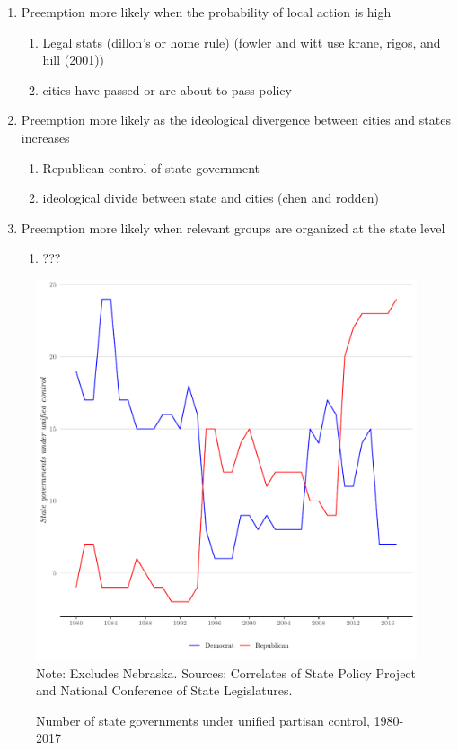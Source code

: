 \documentclass[12pt]{article}
\begin{document}
\begin{enumerate}
	\item Preemption more likely when the probability of local action is high
	\begin{enumerate}
		\item Legal stats (dillon's or home rule) (fowler and witt use krane, rigos, and hill (2001))
		\item cities have passed or are about to pass policy 
	\end{enumerate}
	\item Preemption more likely as the ideological divergence between cities and states increases
	\begin{enumerate}
		\item Republican control of state government
		\item ideological divide between state and cities (chen and rodden)
	\end{enumerate}
	\item Preemption more likely when relevant groups are organized at the state level
	\begin{enumerate}
		\item ???
	\end{enumerate}
\end{enumerate}

\begin{figure}[ht]
\caption{Number of state governments under unified partisan control, 1980-2017}
\centering
\includegraphics[width=.75\textwidth]{plots/party_control}
\newline\scriptsize{Note: Excludes Nebraska. Sources: Correlates of State Policy Project and National Conference of State Legislatures.}
\end{figure}
\end{document}
